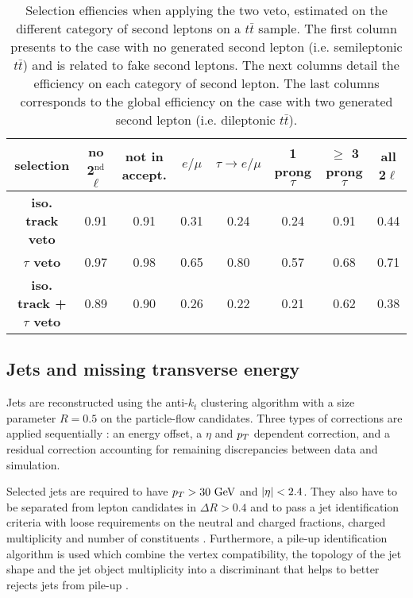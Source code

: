     \begin{table}
    \hspace*{-1.2cm}
    \begin{tabular}{|c|c|ccccc|c|}
        \hline
        \textbf{selection}                  & no 2$^\text{nd}$ $\ell$ & not in accept. & $e/\mu$ & $\tau \rightarrow e/\mu$ & 1 prong $\tau $ & $\geq$ 3 prong $\tau$ & all 2$\ell$ \\
        \hline
        \textbf{iso. track veto}            & 0.91                    & 0.91  & 0.31  & 0.24  & 0.24  & 0.91  & 0.44  \\
        \textbf{$\tau$ veto}                & 0.97                    & 0.98  & 0.65  & 0.80  & 0.57  & 0.68  & 0.71  \\
        \hline
        \textbf{iso. track + $\tau$ veto}   & 0.89                    & 0.90  & 0.26  & 0.22  & 0.21  & 0.62  & 0.38 \\
        \hline
    \end{tabular}
        \caption{Selection effiencies when applying the two veto, estimated on the different
        category of second leptons on a $t\bar{t}$ sample. The first column presents to
        the case with no generated second lepton (i.e. semileptonic $t\bar{t}$) and is
        related to fake second leptons. The next columns detail the efficiency on each
        category of second lepton. The last columns corresponds to the global efficiency
        on the case with two generated second lepton (i.e. dileptonic $t\bar{t}$).}
        \label{tab:secondLeptonVetoPerformances}
    \end{table}

    \subsection{Jets and missing transverse energy \label{sec:analysisJetMET}}

       Jets are reconstructed using the anti-$k_t$ clustering algorithm with a size
       parameter $R = 0.5$ on the particle-flow candidates. Three types of corrections
       are applied sequentially : an energy offset, a $\eta$ and $p_T$ dependent correction,
       and a residual correction accounting for remaining discrepancies between data and simulation.

       Selected jets are required to have $p_T > 30 ~\text{GeV}$ and $\left| \eta \right| < 2.4$. They also
       have to be separated from lepton candidates in $\Delta R > 0.4$ and to pass a jet
       identification criteria with loose requirements on the neutral and
       charged fractions, charged multiplicity and number of constituents \cite{JetID}.
       Furthermore, a pile-up identification algorithm is used which combine the vertex
       compatibility, the topology of the jet shape and the jet object multiplicity into
       a discriminant that helps to better rejects jets from pile-up \cite{PUJetID}.

